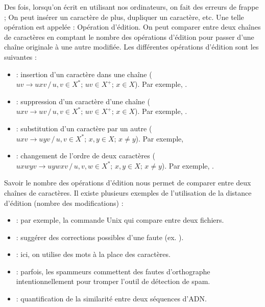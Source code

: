 \documentclass{KodeBook}
\begin{document}
Des fois, lorsqu'on écrit en utilisant nos ordinateurs, on fait des erreurs de frappe ;
On peut insérer un caractère de plus, dupliquer un caractère, etc. 
Une telle opération est appelée : Opération d'édition. 
On peut comparer entre deux chaînes de caractères en comptant le nombre des opérations d'édition pour passer d'une chaîne originale à une autre modifiée.
Les différentes opérations d'édition sont les suivantes :
%
\begin{itemize}
	\item {} : insertion d'un caractère dans une chaîne 
	($uv \rightarrow uxv \,/\, u, v \in X^*;\, uv \in X^+;\, x \in X$).
	Par exemple, .
	
	\item {} : suppression d'un caractère d'une chaîne
	($uxv \rightarrow uv \,/\, u, v \in X^*;\, uv \in X^+;\, x \in X$).
	Par exemple, .
	
	\item {} : substitution d'un caractère par un autre
	($uxv \rightarrow uyv \,/\, u, v \in X^*;\, x, y \in X;\, x \ne y$).
	Par exemple, 
	
	\item {} : changement de l'ordre de deux caractères
	($uxwyv \rightarrow uywxv \,/\, u, v, w \in X^*;\, x, y \in X;\, x \ne y$).
	Par exemple, .
\end{itemize}

Savoir le nombre des opérations d'édition nous permet de comparer entre deux chaînes de caractères. 
Il existe plusieurs exemples de l'utilisation de la distance d'édition (nombre des modifications) :
\begin{itemize}
	\item {} : par exemple, la commande Unix  qui compare entre deux fichiers.
	\item {} : suggérer des corrections possibles d'une faute (ex. ).
	\item {} : ici, on utilise des mots à la place des caractères.
	\item {} : parfois, les spammeurs commettent des fautes d'orthographe intentionnellement pour tromper l'outil de détection de spam.
	\item {} : quantification de la similarité entre deux séquences d'ADN.
\end{itemize}
\end{document}
